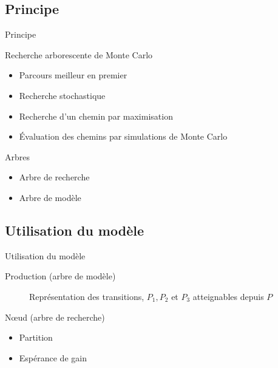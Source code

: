 \documentclass[tikz]{beamer}
\begin{document}
\subsection{Principe}
\begin{frame}[c]{Principe}
  \begin{block}{Recherche arborescente de Monte Carlo}
    \begin{itemize}
      \item Parcours meilleur en premier
      \item Recherche stochastique
      \item Recherche d'un chemin par maximisation
      \item Évaluation des chemins par simulations de Monte Carlo
    \end{itemize}
  \end{block}
  \begin{block}{Arbres}
    \begin{itemize}
      \item Arbre de recherche
      \item Arbre de modèle
    \end{itemize}
  \end{block}
\end{frame}

\subsection{Utilisation du modèle}
\begin{frame}[c]{Utilisation du modèle}
  \begin{block}{Production (arbre de modèle)}
    \begin{figure}
    \begin{center}
    \end{center}
    \caption{Représentation des transitions, \(P_1, P_2\) et \(P_3\)
    atteignables depuis \(P\)}
    \end{figure}
  \end{block}
  \begin{block}{N\oe{}ud (arbre de recherche)}
    \begin{itemize}
      \item Partition
      \item Espérance de gain
    \end{itemize}
  \end{block}
\end{frame}
\end{document}
